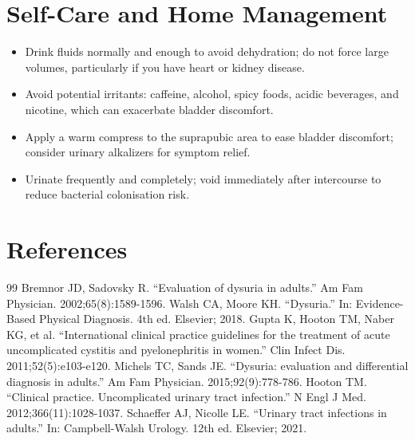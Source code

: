 \section*{Self-Care and Home Management}
\begin{itemize}
  \item Drink fluids normally and enough to avoid dehydration; do not force large volumes, particularly if you have heart or kidney disease.
  \item Avoid potential irritants: caffeine, alcohol, spicy foods, acidic beverages, and nicotine, which can exacerbate bladder discomfort.
  \item Apply a warm compress to the suprapubic area to ease bladder discomfort; consider urinary alkalizers for symptom relief.
  \item Urinate frequently and completely; void immediately after intercourse to reduce bacterial colonisation risk.
\end{itemize}

\section*{References}
\begin{thebibliography}{99}
 Bremnor JD, Sadovsky R. ``Evaluation of dysuria in adults.'' Am Fam Physician. 2002;65(8):1589-1596.
 Walsh CA, Moore KH. ``Dysuria.'' In: Evidence-Based Physical Diagnosis. 4th ed. Elsevier; 2018.
 Gupta K, Hooton TM, Naber KG, et al. ``International clinical practice guidelines for the treatment of acute uncomplicated cystitis and pyelonephritis in women.'' Clin Infect Dis. 2011;52(5):e103-e120.
 Michels TC, Sands JE. ``Dysuria: evaluation and differential diagnosis in adults.'' Am Fam Physician. 2015;92(9):778-786.
 Hooton TM. ``Clinical practice. Uncomplicated urinary tract infection.'' N Engl J Med. 2012;366(11):1028-1037.
 Schaeffer AJ, Nicolle LE. ``Urinary tract infections in adults.'' In: Campbell-Walsh Urology. 12th ed. Elsevier; 2021.
\end{thebibliography}
